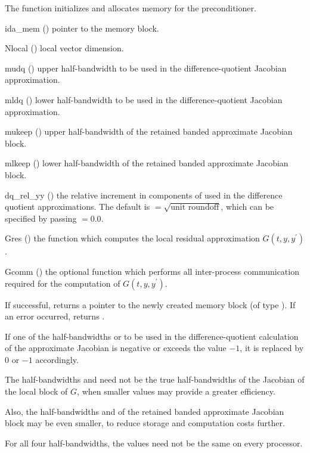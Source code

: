 {
  The function  initializes and allocates
  memory for the {\idabbdpre} preconditioner.
}
{
  \begin{args}[dq\_rel\_yy]
  \item[ida\_mem] ()
    pointer to the {\ida} memory block.
  \item[Nlocal] ()
    local vector dimension.
  \item[mudq] ()
    upper half-bandwidth to be used in the difference-quotient Jacobian approximation.
  \item[mldq] ()
    lower half-bandwidth to be used in the difference-quotient Jacobian approximation.
  \item[mukeep] ()
    upper half-bandwidth of the retained banded approximate Jacobian block.
  \item[mlkeep] ()
    lower half-bandwidth of the retained banded approximate Jacobian block.
  \item[dq\_rel\_yy] ()
    the relative increment in components of  used in the difference quotient
    approximations.  The default 
    is $ = \sqrt{\text{unit roundoff}}$, which
    can be specified by passing $ = 0.0$.
  \item[Gres] ()
    the {\C} function which computes the local residual approximation 
    $G(t,y,y^\prime)$.
  \item[Gcomm] ()
    the optional {\C} function which performs all inter-process communication required
    for the computation of $G(t,y,y^\prime)$.
  \end{args}
}
{
  If successful,  returns a pointer to the newly created 
  {\idabbdpre} memory block (of type ).
  If an error occurred,  returns .
}
{
  If one of the half-bandwidths  or  to be used in the 
  difference-quotient calculation of the approximate Jacobian is negative or 
  exceeds the value $-1$, it is replaced by 0 or $-1$
  accordingly.

  The half-bandwidths  and  need not be the true 
  half-bandwidths of the Jacobian of the local block of $G$,    
  when smaller values may provide a greater efficiency.       

  Also, the half-bandwidths  and  of the retained 
  banded approximate Jacobian block may be even smaller,      
  to reduce storage and computation costs further.            

  For all four half-bandwidths, the values need not be the    
  same on every processor.
}
